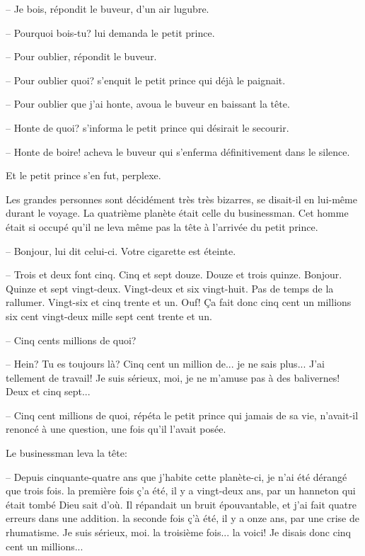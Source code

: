 \documentclass[a4paper]{report}
\begin{document}

-- Je bois, répondit le buveur, d'un air lugubre.

-- Pourquoi bois-tu? lui demanda le petit prince.

-- Pour oublier, répondit le buveur.

-- Pour oublier quoi? s'enquit le petit prince qui déjà le paignait.

-- Pour oublier que j'ai honte, avoua le buveur en baissant la tête.

-- Honte de quoi? s'informa le petit prince qui désirait le secourir.

-- Honte de boire! acheva le buveur qui s'enferma définitivement dans le silence.

Et le petit prince s'en fut, perplexe.

Les grandes personnes sont décidément très très bizarres, se disait-il en lui-même durant le voyage.
\parachapter{} %
La quatrième planète était celle du businessman. Cet homme était si occupé qu'il ne leva même pas la tête à l'arrivée du petit prince.

-- Bonjour, lui dit celui-ci. Votre cigarette est éteinte.

-- Trois et deux font cinq. Cinq et sept douze. Douze et trois quinze. Bonjour. Quinze et sept vingt-deux. Vingt-deux et six vingt-huit. Pas de temps de la rallumer. Vingt-six et cinq trente et un. Ouf! Ça fait donc cinq cent un millions six cent vingt-deux mille sept cent trente et un.


-- Cinq cents millions de quoi?

-- Hein? Tu es toujours là? Cinq cent un million de... je ne sais plus... J'ai tellement de travail! Je suis sérieux, moi, je ne m'amuse pas à des balivernes! Deux et cinq sept...

-- Cinq cent millions de quoi, répéta le petit prince qui jamais de sa vie, n'avait-il renoncé à une question, une fois qu'il l'avait posée.

Le businessman leva la tête:

-- Depuis cinquante-quatre ans que j'habite cette planète-ci, je n'ai été dérangé que trois fois. la première fois ç'a été, il y a vingt-deux ans, par un hanneton qui était tombé Dieu sait d'où. Il répandait un bruit épouvantable, et j'ai fait quatre erreurs dans une addition. la seconde fois ç'à été, il y a onze ans, par une crise de rhumatisme. Je suis sérieux, moi. la troisième fois... la voici! Je disais donc cinq cent un millions...
\end{document}
